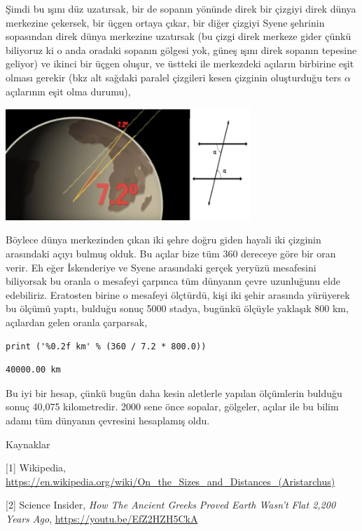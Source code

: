 \documentclass[12pt,fleqn]{article}\usepackage{../../common}
\begin{document}
Şimdi bu ışını düz uzatırsak, bir de sopanın yönünde direk bir çizgiyi direk
dünya merkezine çekersek, bir üçgen ortaya çıkar, bir diğer çizgiyi Syene
şehrinin sopasından direk dünya merkezine uzatırsak (bu çizgi direk merkeze
gider çünkü biliyoruz ki o anda oradaki sopanın gölgesi yok, güneş ışını direk
sopanın tepesine geliyor) ve ikinci bir üçgen oluşur, ve üstteki ile merkezdeki
açıların birbirine eşit olması gerekir (bkz alt sağdaki paralel çizgileri kesen
çizginin oluşturduğu ters $\alpha$ açılarının eşit olma durumu),

\includegraphics[width=25em]{circum2.jpg}

Böylece dünya merkezinden çıkan iki şehre doğru giden hayali iki çizginin
arasındaki açıyı bulmuş olduk. Bu açılar bize tüm 360 dereceye göre bir oran
verir. Eh eğer İskenderiye ve Syene arasındaki gerçek yeryüzü mesafesini
biliyorsak bu oranla o mesafeyi çarpınca tüm dünyanın çevre uzunluğunu elde
edebiliriz. Eratosten birine o mesafeyi ölçtürdü, kişi iki şehir arasında
yürüyerek bu ölçümü yaptı, bulduğu sonuç 5000 stadya, bugünkü ölçüyle yaklaşık
800 km, açılardan gelen oranla çarparsak,

\begin{verbatim}
print ('%0.2f km' % (360 / 7.2 * 800.0))
\end{verbatim}

\begin{verbatim}
40000.00 km
\end{verbatim}

Bu iyi bir hesap, çünkü bugün daha kesin aletlerle yapılan ölçümlerin bulduğu
sonuç 40,075 kilometredir. 2000 sene önce sopalar, gölgeler, açılar ile bu bilim
adamı tüm dünyanın çevresini hesaplamış oldu.

Kaynaklar

[1] Wikipedia,
    \url{https://en.wikipedia.org/wiki/On_the_Sizes_and_Distances_(Aristarchus)}

[2] Science Insider, {\em How The Ancient Greeks Proved Earth Wasn't Flat 2,200 Years Ago},
    \url{https://youtu.be/EfZ2HZH5CkA}
    
\end{document}
